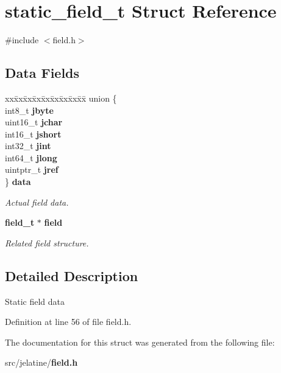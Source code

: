 \section{static\_\-field\_\-t Struct Reference}
\label{structstatic__field__t}


{\ttfamily \#include $<$field.h$>$}

\subsection*{Data Fields}
\begin{DoxyCompactItemize}
\item 
\begin{tabbing}
xx\=xx\=xx\=xx\=xx\=xx\=xx\=xx\=xx\=\kill
union \{\\
\>int8\_t {\bfseries jbyte}\\
\>uint16\_t {\bfseries jchar}\\
\>int16\_t {\bfseries jshort}\\
\>int32\_t {\bfseries jint}\\
\>int64\_t {\bfseries jlong}\\
\>uintptr\_t {\bfseries jref}\\
\} {\bf data}\label{structstatic__field__t_ac68b0dfe6376813ad459bc693962d26b}
\\

\end{tabbing}\begin{DoxyCompactList}\small\item\em Actual field data. \item\end{DoxyCompactList}\item 
{\bf field\_\-t} $\ast$ {\bf field}\label{structstatic__field__t_a0f33247ac8f5c5c9a717c9551f61e0ac}

\begin{DoxyCompactList}\small\item\em Related field structure. \item\end{DoxyCompactList}\end{DoxyCompactItemize}


\subsection{Detailed Description}
Static field data 

Definition at line 56 of file field.h.



The documentation for this struct was generated from the following file:\begin{DoxyCompactItemize}
\item 
src/jelatine/{\bf field.h}\end{DoxyCompactItemize}
